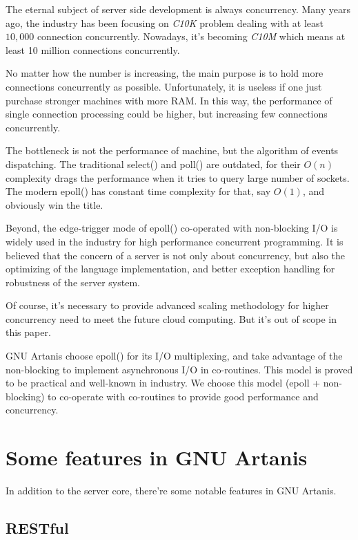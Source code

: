 \documentclass[numbers,numberedpars]{sigplanconf}
\begin{document}
The eternal subject of server side development is always concurrency.
Many years ago, the industry has been focusing on {\it C10K} problem dealing with at least $10,000$ connection concurrently.
Nowadays, it's becoming {\it C10M} which means at least 10 million connections concurrently.

No matter how the number is increasing, the main purpose is to hold more connections concurrently as possible.
Unfortunately, it is useless if one just purchase stronger machines with more RAM. In this way, the performance of single connection
processing could be higher, but increasing few connections concurrently.

The bottleneck is not the performance of machine, but the algorithm of events dispatching. The traditional select() and poll() are outdated,
for their $O(n)$ complexity drags the performance when it tries to query large number of sockets. The modern epoll() has
constant time complexity for that, say $O(1)$, and obviously win the title.

Beyond, the edge-trigger mode of epoll() co-operated with non-blocking I/O is widely used in the industry for high performance concurrent
programming.
It is believed that the concern of a server is not only about concurrency, but also the optimizing of the language implementation,
and better exception handling for robustness of the server system.

Of course, it's necessary to provide advanced scaling methodology for higher concurrency need to meet the future cloud computing. But it's
out of scope in this paper.

GNU Artanis choose epoll() for its I/O multiplexing, and take advantage of the non-blocking to implement asynchronous I/O in co-routines.
This model is proved to be practical and well-known in industry. We choose this model (epoll + non-blocking) to co-operate with co-routines
to provide good performance and concurrency.

\section{Some features in GNU Artanis} \label{Some features in GNU Artanis}

In addition to the server core, there're some notable features in GNU Artanis.

\subsection{RESTful}
\end{document}
